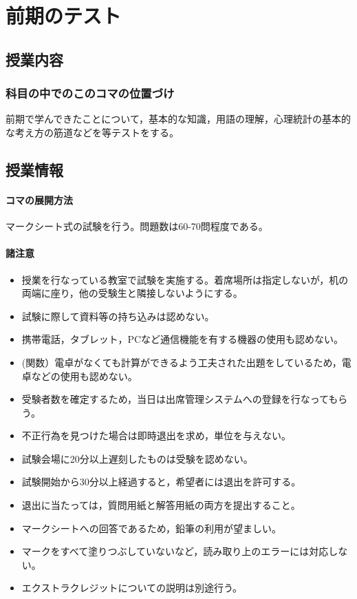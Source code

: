 \section{前期のテスト}
\label{s15_FirstSemester}

\subsection{授業内容}
\subsubsection{科目の中でのこのコマの位置づけ}
前期で学んできたことについて，基本的な知識，用語の理解，心理統計の基本的な考え方の筋道などを等テストをする。
\subsection{授業情報}
\paragraph{コマの展開方法}
マークシート式の試験を行う。問題数は60-70問程度である。
\paragraph{諸注意}
\begin{itemize}
	\item 授業を行なっている教室で試験を実施する。着席場所は指定しないが，机の両端に座り，他の受験生と隣接しないようにする。
	\item 試験に際して資料等の持ち込みは認めない。
	\item 携帯電話，タブレット，PCなど通信機能を有する機器の使用も認めない。
	\item (関数）電卓がなくても計算ができるよう工夫された出題をしているため，電卓などの使用も認めない。
	\item 受験者数を確定するため，当日は出席管理システムへの登録を行なってもらう。
	\item 不正行為を見つけた場合は即時退出を求め，単位を与えない。
	\item 試験会場に20分以上遅刻したものは受験を認めない。
	\item 試験開始から30分以上経過すると，希望者には退出を許可する。
	\item 退出に当たっては，質問用紙と解答用紙の両方を提出すること。
	\item マークシートへの回答であるため，鉛筆の利用が望ましい。
	\item マークをすべて塗りつぶしていないなど，読み取り上のエラーには対応しない。
	\item エクストラクレジットについての説明は別途行う。
\end{itemize}
